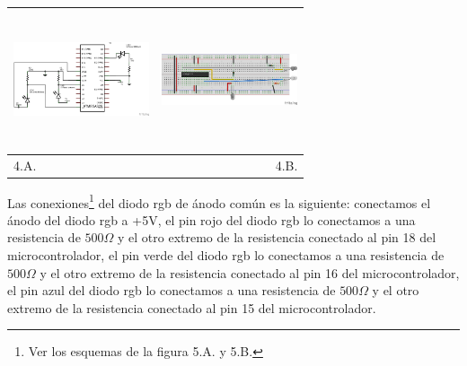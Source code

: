 \documentclass[12]{article}
\newenvironment{Figure}
{\par\medskip\noindent\minipage{\linewidth}}
{\endminipage\par\medskip}
\begin{document}
\begin{multicols}{2}
\begin{Figure}
\begin{tabular}{|l|r|}
\includegraphics[width=4cm, height=4cm]{img/ledesq.png} & \includegraphics[width=4cm, height=4cm]{img/ledmont.png} \\ \hline
4.A. & 4.B. \\ \hline
\end{tabular}
\label{fig:g4}
\end{Figure}


Las conexiones\footnote{Ver los esquemas de la figura 5.A. y 5.B.} del diodo rgb de ánodo común es la siguiente: conectamos el ánodo del diodo rgb a +5V, el pin rojo del diodo rgb lo conectamos a una resistencia de $500\Omega$ y el otro extremo de la resistencia conectado al pin 18 del microcontrolador, el pin verde del diodo rgb lo conectamos a una resistencia de $500\Omega$ y el otro extremo de la resistencia conectado al pin 16 del microcontrolador, el pin azul del diodo rgb lo conectamos a una resistencia de $500\Omega$ y el otro extremo de la resistencia conectado al pin 15 del microcontrolador.



\end{multicols}
\end{document}
